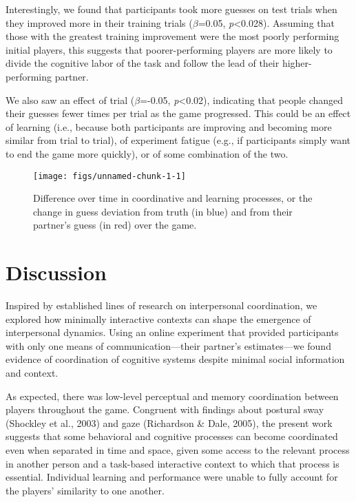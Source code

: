 \documentclass[10pt, letterpaper]{article}
\newenvironment{CodeChunk}{}{}
\begin{document}
Interestingly, we found that participants took more guesses on test
trials when they improved more in their training trials
(\emph{\(\beta\)}=0.05, \emph{p}\textless{}0.028). Assuming that those
with the greatest training improvement were the most poorly performing
initial players, this suggests that poorer-performing players are more
likely to divide the cognitive labor of the task and follow the lead of
their higher-performing partner.

We also saw an effect of trial (\emph{\(\beta\)}=-0.05,
\emph{p}\textless{}0.02), indicating that people changed their guesses
fewer times per trial as the game progressed. This could be an effect of
learning (i.e., because both participants are improving and becoming
more similar from trial to trial), of experiment fatigue (e.g., if
participants simply want to end the game more quickly), or of some
combination of the two.

\begin{CodeChunk}
\begin{figure}[H]

\texttt{[image: figs/unnamed-chunk-1-1]} \hfill{}

\caption[Difference over time in coordinative and learning processes, or the change in guess deviation from truth (in blue) and from their partner's guess (in red) over the game]{Difference over time in coordinative and learning processes, or the change in guess deviation from truth (in blue) and from their partner's guess (in red) over the game.}\label{fig:unnamed-chunk-1}
\end{figure}
\end{CodeChunk}

\section{Discussion}\label{discussion}

Inspired by established lines of research on interpersonal coordination,
we explored how minimally interactive contexts can shape the emergence
of interpersonal dynamics. Using an online experiment that provided
participants with only one means of communication---their partner's
estimates---we found evidence of coordination of cognitive systems
despite minimal social information and context.

As expected, there was low-level perceptual and memory coordination
between players throughout the game. Congruent with findings about
postural sway (Shockley et al., 2003) and gaze (Richardson \& Dale,
2005), the present work suggests that some behavioral and cognitive
processes can become coordinated even when separated in time and space,
given some access to the relevant process in another person and a
task-based interactive context to which that process is essential.
Individual learning and performance were unable to fully account for the
players' similarity to one another.
\end{document}
